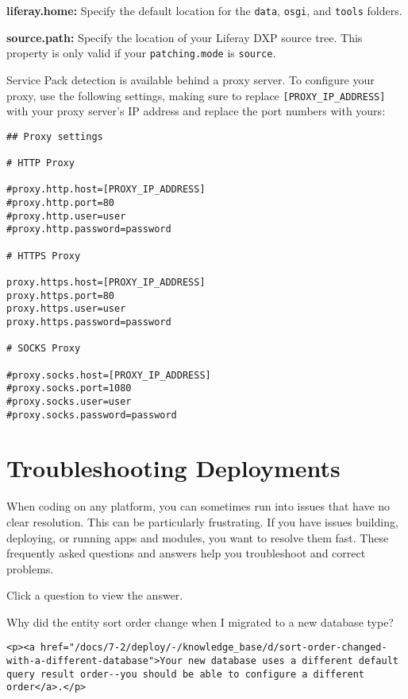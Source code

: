 \textbf{liferay.home:} Specify the default location for the
\texttt{data}, \texttt{osgi}, and \texttt{tools} folders.

\textbf{source.path:} Specify the location of your Liferay DXP source
tree. This property is only valid if your \texttt{patching.mode} is
\texttt{source}.

Service Pack detection is available behind a proxy server. To configure
your proxy, use the following settings, making sure to replace
\texttt{{[}PROXY\_IP\_ADDRESS{]}} with your proxy server's IP address
and replace the port numbers with yours:

\begin{verbatim}
## Proxy settings

# HTTP Proxy

#proxy.http.host=[PROXY_IP_ADDRESS]
#proxy.http.port=80
#proxy.http.user=user
#proxy.http.password=password

# HTTPS Proxy

proxy.https.host=[PROXY_IP_ADDRESS]
proxy.https.port=80
proxy.https.user=user
proxy.https.password=password

# SOCKS Proxy

#proxy.socks.host=[PROXY_IP_ADDRESS]
#proxy.socks.port=1080
#proxy.socks.user=user
#proxy.socks.password=password
\end{verbatim}

\chapter{Troubleshooting Deployments}\label{troubleshooting-deployments}

When coding on any platform, you can sometimes run into issues that have
no clear resolution. This can be particularly frustrating. If you have
issues building, deploying, or running apps and modules, you want to
resolve them fast. These frequently asked questions and answers help you
troubleshoot and correct problems.

Click a question to view the answer.

{Why did the entity sort order change when I migrated to a new database
type?~{}}

\begin{verbatim}
<p><a href="/docs/7-2/deploy/-/knowledge_base/d/sort-order-changed-with-a-different-database">Your new database uses a different default query result order--you should be able to configure a different order</a>.</p>
\end{verbatim}

